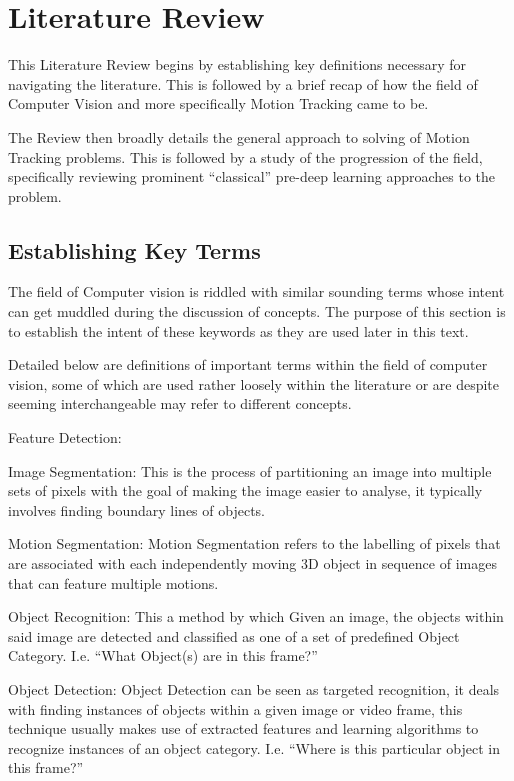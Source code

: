 \chapter{Literature Review}\label{literature_review}

This Literature Review begins by establishing key definitions necessary for navigating
the literature. This is followed by a brief recap of how the field of Computer
Vision and more specifically Motion Tracking came to be.

The Review then broadly details the general approach to solving of Motion Tracking
problems. This is followed by a study of the progression of the field,
specifically reviewing prominent “classical” pre-deep learning approaches to the
problem.

\section{Establishing Key Terms}
The field of Computer vision is riddled with similar sounding terms whose intent
can get muddled during the discussion of concepts.  The purpose of this section
is to establish the intent of these keywords as they are used later in this text.

Detailed below are definitions of important terms within the field of computer
vision, some of which are used rather loosely within the literature or are
despite seeming interchangeable may refer to different concepts. 

Feature Detection:

Image Segmentation: This is the process of partitioning an image into multiple
sets of pixels with the goal of making the image easier to analyse, it typically
involves finding boundary lines of objects. 

Motion Segmentation: Motion Segmentation refers to the labelling of pixels that
are associated with each independently moving 3D object in sequence of images
that can feature multiple motions.~\cite{Tekalp2014}

Object Recognition: This a method by which Given an image, the objects within
said image are detected and classified as one of a set of predefined Object
Category.  I.e. “What Object(s) are in this frame?”

Object Detection: Object Detection can be seen as targeted recognition, it deals
with finding instances of objects within a given image or video frame, this
technique usually makes use of extracted features and learning algorithms to
recognize instances of an object category.  I.e. “Where is this particular
object in this frame?”

